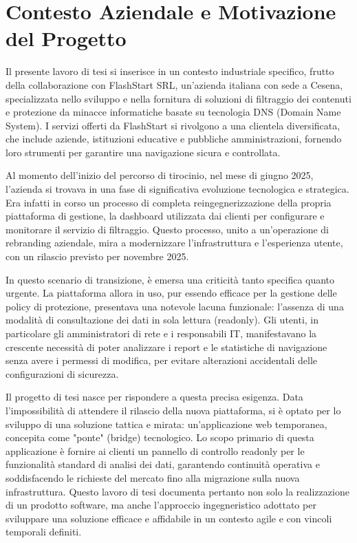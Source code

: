 \documentclass[12pt,a4paper,openright,twoside]{book}
\begin{document}
\section{Contesto Aziendale e Motivazione del Progetto}
\label{sec:contesto_e_motivazione}

Il presente lavoro di tesi si inserisce in un contesto industriale specifico, frutto della collaborazione con FlashStart SRL, un'azienda italiana con sede a Cesena, specializzata nello sviluppo e nella fornitura di soluzioni di filtraggio dei contenuti e protezione da minacce informatiche basate su tecnologia DNS (Domain Name System). I servizi offerti da FlashStart si rivolgono a una clientela diversificata, che include aziende, istituzioni educative e pubbliche amministrazioni, fornendo loro strumenti per garantire una navigazione sicura e controllata.

Al momento dell'inizio del percorso di tirocinio, nel mese di giugno 2025, l'azienda si trovava in una fase di significativa evoluzione tecnologica e strategica. Era infatti in corso un processo di completa reingegnerizzazione della propria piattaforma di gestione, la dashboard utilizzata dai clienti per configurare e monitorare il servizio di filtraggio. Questo processo, unito a un'operazione di rebranding aziendale, mira a modernizzare l'infrastruttura e l'esperienza utente, con un rilascio previsto per novembre 2025.

In questo scenario di transizione, è emersa una criticità tanto specifica quanto urgente. La piattaforma allora in uso, pur essendo efficace per la gestione delle policy di protezione, presentava una notevole lacuna funzionale: l'assenza di una modalità di consultazione dei dati in sola lettura (readonly). Gli utenti, in particolare gli amministratori di rete e i responsabili IT, manifestavano la crescente necessità di poter analizzare i report e le statistiche di navigazione senza avere i permessi di modifica, per evitare alterazioni accidentali delle configurazioni di sicurezza.

Il progetto di tesi nasce per rispondere a questa precisa esigenza. Data l'impossibilità di attendere il rilascio della nuova piattaforma, si è optato per lo sviluppo di una soluzione tattica e mirata: un'applicazione web temporanea, concepita come "ponte" (bridge) tecnologico. Lo scopo primario di questa applicazione è fornire ai clienti un pannello di controllo readonly per le funzionalità standard di analisi dei dati, garantendo continuità operativa e soddisfacendo le richieste del mercato fino alla migrazione sulla nuova infrastruttura. Questo lavoro di tesi documenta pertanto non solo la realizzazione di un prodotto software, ma anche l'approccio ingegneristico adottato per sviluppare una soluzione efficace e affidabile in un contesto agile e con vincoli temporali definiti.
\end{document}
